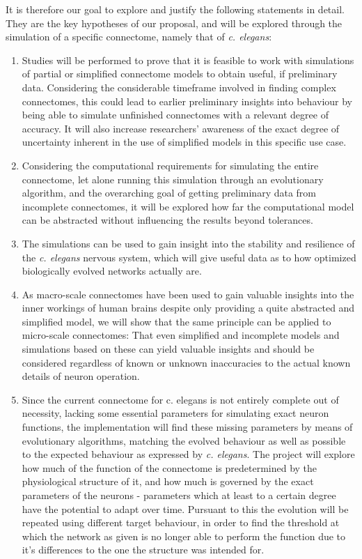 \documentclass[a4paper,11pt]{article}
\begin{document}
It is therefore our goal to explore and justify the following statements in detail. They are the key hypotheses of our proposal, and will be explored through the simulation of a specific connectome, namely that of \emph{c. elegans}:
\begin{enumerate}
\item Studies will be performed to prove that it is feasible to work with simulations of partial or simplified connectome models to obtain useful, if preliminary data. Considering the considerable timeframe involved in finding complex connectomes, this could lead to earlier preliminary insights into behaviour by being able to simulate unfinished connectomes with a relevant degree of accuracy. It will also increase researchers' awareness of the exact degree of uncertainty inherent in the use of simplified models in this specific use case.
\item Considering the computational requirements for simulating the entire connectome, let alone running this simulation through an evolutionary algorithm, and the overarching goal of getting preliminary data from incomplete connectomes, it will be explored how far the computational model can be abstracted without influencing the results beyond tolerances.
\item The simulations can be used to gain insight into the stability and resilience of the \emph{c. elegans} nervous system, which will give useful data as to how optimized biologically evolved networks actually are. 
\item As macro-scale connectomes have been used to gain valuable insights into the inner workings of human brains despite only providing a quite abstracted and simplified model, we will show that the same principle can be applied to micro-scale connectomes: That even simplified and incomplete models and simulations based on these can yield valuable insights and should be considered regardless of known or unknown inaccuracies to the actual known details of neuron operation. 
\item Since the current connectome for c. elegans is not entirely complete out of necessity, lacking some essential parameters for simulating exact neuron functions, the implementation will find these missing parameters by means of evolutionary algorithms, matching the evolved behaviour as well as possible to the expected behaviour as expressed by \emph{c. elegans}. The project will explore how much of the function of the connectome is predetermined by the physiological structure of it, and how much is governed by the exact parameters of the neurons - parameters which at least to a certain degree have the potential to adapt over time. Pursuant to this the evolution will be repeated using different target behaviour, in order to find the threshold at which the network as given is no longer able to perform the function due to it's differences to the one the structure was intended for. 
\end{enumerate}
\end{document}
